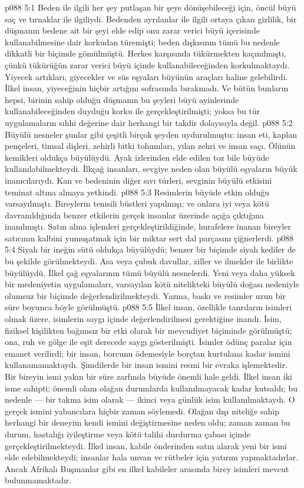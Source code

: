 \vs p088 5:1 Beden ile ilgili her şey putlaşan bir şeye dönüşebileceği için, öncül büyü saç ve tırnaklar ile ilgiliydi. Bedenden ayrılanlar ile ilgili ortaya çıkan gizlilik, bir düşmanın bedene ait bir şeyi elde edip onu zarar verici büyü içerisinde kullanabilmesine dair korkudan türemişti; beden dışkısının tümü bu nedenle dikkatli bir biçimde gömülmüştü. Herkes karşısında tükürmekten kaçınılmıştı, çünkü tükürüğün zarar verici büyü içinde kullanabileceğinden korkulmaktaydı. Yiyecek artıkları, giyecekler ve süs eşyaları büyünün araçları haline gelebilirdi. İlkel insan, yiyeceğinin hiçbir artığını sofrasında bırakmadı. Ve bütün bunların hepsi, birinin sahip olduğu düşmanın bu şeyleri büyü ayinlerinde kullanabileceğinden duyduğu korku ile gerçekleştirilmişti; yoksa bu tür uygulamaların sıhhi değerine dair herhangi bir takdir dolayısıyla değil.
\vs p088 5:2 Büyülü nesneler şunlar gibi çeşitli birçok şeyden uydurulmuştu: insan eti, kaplan pençeleri, timsal dişleri, zehirli bitki tohumları, yılan zehri ve insan saçı. Ölünün kemikleri oldukça büyülüydü. Ayak izlerinden elde edilen toz bile büyüde kullanılabilmekteydi. İlkçağ insanları, sevgiye neden olan büyülü eşyaların büyük inanıcılarıydı. Kan ve bedeninin diğer sıvı türleri, sevginin büyülü etkisini teminat altına almaya yetkindi.
\vs p088 5:3 Resimlerin büyüde etkin olduğu varsayılmıştı. Bireylerin temsili büstleri yapılmışı; ve onlara iyi veya kötü davranıldığında benzer etkilerin gerçek insanlar üzerinde açığa çıktığına inanılmıştı. Satın alma işlemleri gerçekleştirildiğinde, hurafelere inanan bireyler satıcının kalbini yumuşatmak için bir miktar sert dal parçasını çiğnerlerdi.
\vs p088 5:4 Siyah bir ineğin sütü oldukça büyülüydü; benzer bir biçimde siyah kediler de bu şekilde görülmekteydi. Asa veya çubuk davullar, ziller ve ilmekler ile birlikte büyülüydü. İlkel çağ eşyalarının tümü büyülü nesnelerdi. Yeni veya daha yüksek bir medeniyetin uygulamaları, varsayılan kötü nitelikteki büyülü doğası nedeniyle olumsuz bir biçimde değerlendirilmekteydi. Yazma, baskı ve resimler uzun bir süre boyunca böyle görülmüştü.
\vs p088 5:5 İlkel insan, özellikle tanrıların isimleri olmak üzere, isimlerin saygı içinde değerlendirilmesi gerektiğine inandı. İsim, fiziksel kişilikten bağımsız bir etki olarak bir mevcudiyet biçiminde görülmüştü; ona, ruh ve gölge ile eşit derecede saygı gösterilmişti. İsimler ödünç paralar için emanet verilirdi; bir insan, borcunu ödemesiyle borçtan kurtulana kadar ismini kullanamamaktaydı. Şimdilerde bir insan ismini resmi bir evraka işlemektedir. Bir bireyin ismi yakın bir süre zarfında büyüde önemli hale geldi. İlkel insan iki isme sahipti; önemli olanı olağan durumlarda kullanılmayacak kadar kutsaldı; bu nedenle --- bir takma isim olarak --- ikinci veya günlük isim kullanılmaktaydı. O gerçek ismini yabancılara hiçbir zaman söylemedi. Olağan dışı niteliğe sahip herhangi bir deneyim kendi ismini değiştirmesine neden oldu; zaman zaman bu durum, hastalığı iyileştirme veya kötü talihi durdurma çabası içinde gerçekleştirilmekteydi. İlkel insan, kabile önderinden satın alarak yeni bir ismi elde edebilmekteydi; insanlar hala unvan ve rütbeler için yatırım yapmaktadırlar. Ancak Afrikalı Buşmanlar gibi en ilkel kabileler arasında birey isimleri mevcut bulunmamaktadır.
